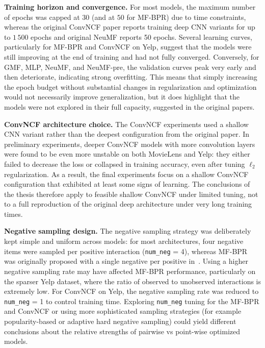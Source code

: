 \documentclass[11pt]{article}
\begin{document}
\textbf{Training horizon and convergence.}  
    For most models, the maximum number of epochs was capped at $30$ (and at $50$ for MF-BPR) due to time constraints, whereas the original ConvNCF paper reports training deep CNN variants for up to $1\,500$ epochs and original NeuMF reports 50 epochs. Several learning curves, particularly for MF-BPR and ConvNCF on Yelp, suggest that the models were still improving at the end of training and had not fully converged. Conversely, for GMF, MLP, NeuMF, and NeuMF-pre, the validation curves peak very early and then deteriorate, indicating strong overfitting. This means that simply increasing the epoch budget without substantial changes in regularization and optimization would not necessarily improve generalization, but it does highlight that the models were not explored in their full capacity, suggested in the original papers.

\textbf{ConvNCF architecture choice.}  
    The ConvNCF experiments used a shallow CNN variant rather than the deepest configuration from the original paper. In preliminary experiments, deeper ConvNCF models with more convolution layers were found to be even more unstable on both MovieLens and Yelp: they either failed to decrease the loss or collapsed in training accuracy, even after tuning $\ell_2$ regularization. As a result, the final experiments focus on a shallow ConvNCF configuration that exhibited at least some signs of learning. The conclusions of the thesis therefore apply to feasible shallow ConvNCF under limited tuning, not to a full reproduction of the original deep architecture under very long training times.

 \textbf{Negative sampling design.}  
    The negative sampling strategy was deliberately kept simple and uniform across models: for most architectures, four negative items were sampled per positive interaction (\texttt{num\_neg} = 4), whereas MF-BPR was originally proposed with a single negative per positive in~\cite{rendle2012bpr}. Using a higher negative sampling rate may have affected MF-BPR performance, particularly on the sparser Yelp dataset, where the ratio of observed to unobserved interactions is extremely low. For ConvNCF on Yelp, the negative sampling rate was reduced to \texttt{num\_neg} = 1 to control training time. Exploring \texttt{num\_neg} tuning for the MF-BPR and ConvNCF or using  more sophisticated sampling strategies (for example popularity-based or adaptive hard negative sampling) could yield different conclusions about the relative strengths of pairwise vs point-wise optimized models.
\end{document}
